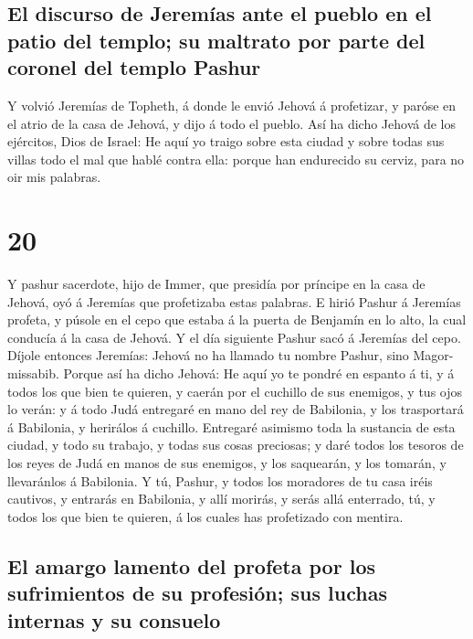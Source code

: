 \hypertarget{el-discurso-de-jeremuxedas-ante-el-pueblo-en-el-patio-del-templo-su-maltrato-por-parte-del-coronel-del-templo-pashur}{%
\subsection{El discurso de Jeremías ante el pueblo en el patio del
templo; su maltrato por parte del coronel del templo
Pashur}\label{el-discurso-de-jeremuxedas-ante-el-pueblo-en-el-patio-del-templo-su-maltrato-por-parte-del-coronel-del-templo-pashur}}

 Y volvió Jeremías de Topheth, á donde le envió Jehová á
profetizar, y paróse en el atrio de la casa de Jehová, y dijo á todo el
pueblo.  Así ha dicho Jehová de los ejércitos, Dios de
Israel: He aquí yo traigo sobre esta ciudad y sobre todas sus villas
todo el mal que hablé contra ella: porque han endurecido su cerviz, para
no oir mis palabras.

\hypertarget{section-19}{%
\section{20}\label{section-19}}

 Y pashur sacerdote, hijo de Immer, que presidía por
príncipe en la casa de Jehová, oyó á Jeremías que profetizaba estas
palabras.  E hirió Pashur á Jeremías profeta, y púsole en el
cepo que estaba á la puerta de Benjamín en lo alto, la cual conducía á
la casa de Jehová.  Y el día siguiente Pashur sacó á
Jeremías del cepo. Díjole entonces Jeremías: Jehová no ha llamado tu
nombre Pashur, sino Magor-missabib.  Porque así ha dicho
Jehová: He aquí yo te pondré en espanto á ti, y á todos los que bien te
quieren, y caerán por el cuchillo de sus enemigos, y tus ojos lo verán:
y á todo Judá entregaré en mano del rey de Babilonia, y los trasportará
á Babilonia, y herirálos á cuchillo.  Entregaré asimismo
toda la sustancia de esta ciudad, y todo su trabajo, y todas sus cosas
preciosas; y daré todos los tesoros de los reyes de Judá en manos de sus
enemigos, y los saquearán, y los tomarán, y llevaránlos á Babilonia.
 Y tú, Pashur, y todos los moradores de tu casa iréis
cautivos, y entrarás en Babilonia, y allí morirás, y serás allá
enterrado, tú, y todos los que bien te quieren, á los cuales has
profetizado con mentira.

\hypertarget{el-amargo-lamento-del-profeta-por-los-sufrimientos-de-su-profesiuxf3n-sus-luchas-internas-y-su-consuelo}{%
\subsection{El amargo lamento del profeta por los sufrimientos de su
profesión; sus luchas internas y su
consuelo}\label{el-amargo-lamento-del-profeta-por-los-sufrimientos-de-su-profesiuxf3n-sus-luchas-internas-y-su-consuelo}}

